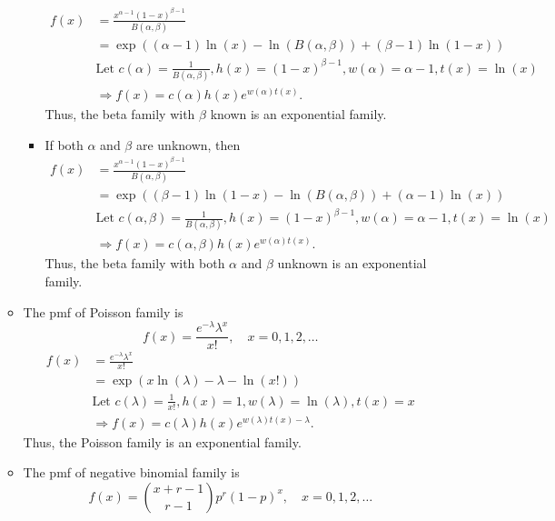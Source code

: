 \documentclass[12pt]{article}
\newenvironment{problem}[2][Problem]{\begin{trivlist}
\item[\hskip \labelsep {\bfseries #1}\hskip \labelsep {\bfseries #2.}]}
{\end{trivlist}}
\begin{document}
\begin{problem}{6}
\begin{itemize}
\begin{itemize}
\begin{itemize}
\[\begin{aligned}
            f(x) &= \frac{x^{\alpha - 1} (1-x)^{\beta - 1}}{B(\alpha, \beta)} \\
            &= \exp\left( (\alpha - 1) \ln(x) - \ln(B(\alpha, \beta)) + 
            (\beta - 1) \ln(1-x) \right) \\
            &\text{Let } c(\alpha) = \frac{1}{B(\alpha, \beta)}, 
            h(x) = (1-x)^{\beta - 1}, w(\alpha) = \alpha - 1, t(x) = \ln(x)\\
            &\Rightarrow f(x) = c(\alpha) h(x) e^{w(\alpha) t(x)}.
          \end{aligned}
        \]
        Thus, the beta family with $\beta$ known is an exponential family.
        \item If both $\alpha$ and $\beta$ are unknown, then
        \[
          \begin{aligned}
            f(x) &= \frac{x^{\alpha - 1} (1-x)^{\beta - 1}}{B(\alpha, \beta)} \\
            &= \exp\left( (\beta - 1) \ln(1-x) - \ln(B(\alpha, \beta)) + 
            (\alpha - 1) \ln(x) \right) \\
            &\text{Let } c(\alpha, \beta) = \frac{1}{B(\alpha, \beta)}, 
            h(x) = (1-x)^{\beta - 1}, w(\alpha) = \alpha - 1, t(x) = \ln(x)\\
            &\Rightarrow f(x) = c(\alpha, \beta) h(x) e^{w(\alpha) t(x)}.
          \end{aligned}
        \]
      Thus, the beta family with both $\alpha$ and $\beta$ unknown 
      is an exponential family.
      \end{itemize}
      \item [(d)] The pmf of Poisson family is
      \[
        f(x) = \frac{e^{-\lambda} \lambda^x}{x!}, \quad x = 0,1,2,\ldots
      \]
      \[
        \begin{aligned}
          f(x) &= \frac{e^{-\lambda} \lambda^x}{x!} \\
          &= \exp\left( x \ln(\lambda) - \lambda - \ln(x!) \right) \\
          &\text{Let } c(\lambda) = \frac{1}{x!}, h(x) = 1, w(\lambda) 
          = \ln(\lambda), t(x) = x\\
          &\Rightarrow f(x) = c(\lambda) h(x) e^{w(\lambda) t(x) - \lambda}.
        \end{aligned}
      \]
      Thus, the Poisson family is an exponential family.
      \item [(e)] The pmf of negative binomial family is
      \[
        f(x) = \binom{x+r-1}{r-1} p^r (1-p)^x, \quad x = 0,1,2,\ldots
\]
\end{itemize}
\end{itemize}
\end{problem}
\end{document}

